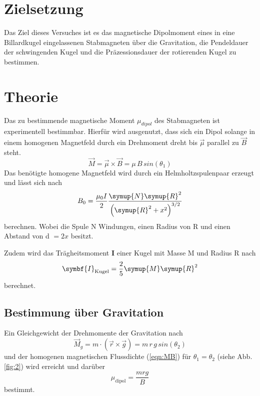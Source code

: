 \section{Zielsetzung}
\label{sec:Zielsetzung}

Das Ziel dieses Versuches ist es das magnetische Dipolmoment eines in eine
Billardkugel eingelassenen Stabmagneten über die Gravitation, die Pendeldauer
der schwingenden Kugel und die Präzessionsdauer der rotierenden Kugel zu bestimmen.


\section{Theorie}
\label{sec:Theorie}

Das zu bestimmende magnetische Moment $\mu_{dipol}$ des Stabmagneten
ist experimentell bestimmbar. Hierfür wird ausgenutzt, dass
sich ein Dipol solange in einem homogenen Magnetfeld durch ein
Drehmoment dreht bis $\vec{\mu}$ parallel zu $\vec{B}$ steht.
\begin{equation}
  \vec{M} = \vec{\mu} \times \vec{B} = \mu \, B \, sin(\theta_{1})
  \label{eqn:MB}
\end{equation}
Das benötigte homogene Magnetfeld wird durch ein Helmholtzspulenpaar erzeugt
und lässt sich nach
\begin{equation}
  B_0 = \frac{\mu_0I}{2}\frac{\symup{N}\symup{R}^2}{\left(\symup{R}^2+x^2\right)^{3/2}}
  \label{eqn:b0}
\end{equation}
berechnen. Wobei die Spule N Windungen, einen Radius von R und einen Abstand von d $=2x$
besitzt.

Zudem wird das Trägheitsmoment $\symbf{I}$ einer Kugel mit Masse M und Radius R nach
\begin{equation}
  \symbf{I}_\text{Kugel}=\frac{2}{5}\symup{M}\symup{R}^2
  \label{eqn:Ik}
\end{equation}
berechnet.

\subsection{Bestimmung über Gravitation}
Ein Gleichgewicht der Drehmomente der Gravitation nach
\begin{equation}
  {\vec{M}}_{g}= m \cdot \left(\vec{r}\times\vec{g}\right) = m\, r \, g\, sin(\theta_{2})
\end{equation}
und der homogenen magnetischen Flussdichte (\ref{eqn:MB})
für $\theta_1 =\theta_2$ (siehe Abb.\ref{fig:2}) wird erreicht und darüber
\begin{equation}
  \mu_\text{dipol}=\frac{mrg}{B}
  \label{eqn:grav}
\end{equation}
bestimmt.
